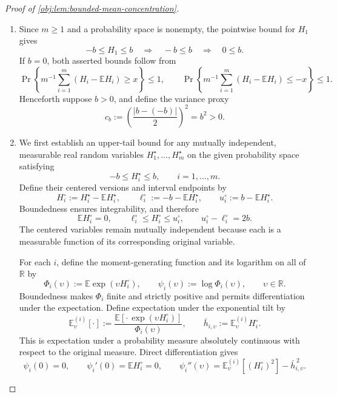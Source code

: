 \documentclass[11pt]{article}
\begin{document}
\begin{proof}[Proof of \cref{obj:lem:bounded-mean-concentration}]
\begin{enumerate}
\item
Since \(m\ge1\) and a probability space is nonempty, the pointwise bound for \(H_1\) gives
\[
-b\le H_1\le b
\quad\Longrightarrow\quad
-b\le b
\quad\Longrightarrow\quad
0\le b.
\]
If \(b=0\), both asserted bounds follow from
\[
\Pr\left\{m^{-1}\sum_{i=1}^m(H_i-\mathbb EH_i)\ge x\right\}\le1,
\qquad
\Pr\left\{m^{-1}\sum_{i=1}^m(H_i-\mathbb EH_i)\le-x\right\}\le1.
\]
Henceforth suppose \(b>0\), and define the variance proxy
\[
c_b:=\left(\frac{|b-(-b)|}{2}\right)^2=b^2>0.
\]

\item
We first establish an upper-tail bound for any mutually independent, measurable real random variables \(H_1^\star,\ldots,H_m^\star\) on the given probability space satisfying
\[
-b\le H_i^\star\le b,
\qquad i=1,\ldots,m.
\]
Define their centered versions and interval endpoints by
\[
H_i^\circ:=H_i^\star-\mathbb EH_i^\star,
\qquad
\ell_i^\circ:=-b-\mathbb EH_i^\star,
\qquad
u_i^\circ:=b-\mathbb EH_i^\star.
\]
Boundedness ensures integrability, and therefore
\[
\mathbb EH_i^\circ=0,
\qquad
\ell_i^\circ\le H_i^\circ\le u_i^\circ,
\qquad
u_i^\circ-\ell_i^\circ=2b.
\]
The centered variables remain mutually independent because each is a measurable function of its corresponding original variable.

For each \(i\), define the moment-generating function and its logarithm on all of \(\mathbb R\) by
\[
\Phi_i(\upsilon):=\mathbb E\exp(\upsilon H_i^\circ),
\qquad
\psi_i(\upsilon):=\log\Phi_i(\upsilon),
\qquad \upsilon\in\mathbb R.
\]
Boundedness makes \(\Phi_i\) finite and strictly positive and permits differentiation under the expectation. Define expectation under the exponential tilt by
\[
\mathbb E_{\upsilon}^{(i)}[\cdot]
:=
\frac{\mathbb E[\cdot\,\exp(\upsilon H_i^\circ)]}{\Phi_i(\upsilon)},
\qquad
\bar h_{i,\upsilon}:=\mathbb E_{\upsilon}^{(i)}H_i^\circ.
\]
This is expectation under a probability measure absolutely continuous with respect to the original measure. Direct differentiation gives
\[
\psi_i(0)=0,
\qquad
\psi_i'(0)=\mathbb EH_i^\circ=0,
\qquad
\psi_i''(\upsilon)
=
\mathbb E_{\upsilon}^{(i)}[(H_i^\circ)^2]
-\bar h_{i,\upsilon}^{\,2}.
\]


\end{enumerate}
\end{proof}
\end{document}
